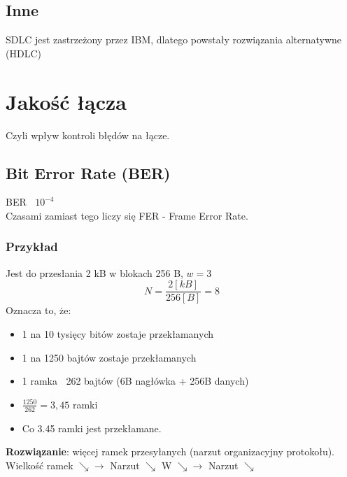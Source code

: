 		\subsection{Inne}
			SDLC jest zastrzeżony przez IBM, dlatego powstały rozwiązania alternatywne (HDLC)
	\section{Jakość łącza}
		Czyli wpływ kontroli błędów na łącze.\\
		\subsection{Bit Error Rate (BER)}
			BER $ ~ $ $ 10^{-4} $ \\
			Czasami zamiast tego liczy się FER - Frame Error Rate.
			\subsubsection{Przykład}
				Jest do przesłania 2 kB w blokach 256 B, $ w = 3 $\\
				\begin{equation}
				 N = \frac{2[kB]}{256[B]}=8 
				\end{equation}
				Oznacza to, że:
				\begin{itemize}
					\item 1 na 10 tysięcy bitów zostaje przekłamanych
					\item 1 na 1250 bajtów zostaje przekłamanych
					\item 1 ramka $ ~ $ 262 bajtów (6B nagłówka + 256B danych)
					\item $ \frac{1250}{262}=3,45 $ ramki
					\item Co 3.45 ramki jest przekłamane.
				\end{itemize}
				\textbf{Rozwiązanie}: więcej ramek przesyłanych (narzut organizacyjny protokołu).\\
				Wielkość ramek $ \searrow \rightarrow $ Narzut $ \searrow $ W $ \searrow \rightarrow $ Narzut $ \searrow $
